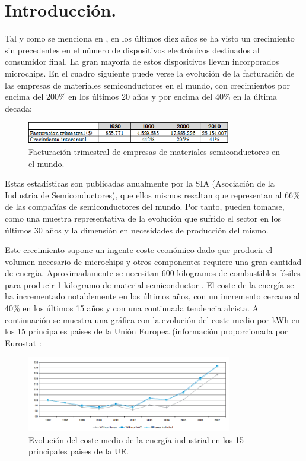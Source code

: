 \section{Introducción.}

Tal y como se menciona en \cite{reusing-silicon}, en los últimos diez años se ha visto un crecimiento sin 
precedentes en el número de dispositivos electrónicos destinados al consumidor final. La gran mayoría de estos dispositivos llevan incorporados microchips. En el cuadro siguiente puede verse la evolución de la facturación de las empresas de materiales semiconductores en el mundo, con crecimientos por encima del 200\% en los últimos 20 años y por encima del 40\% en la última decada:

\begin{figure}[H]
\begin{center}
\includegraphics[width=0.8\textwidth]{img/estadisticas_chips}
\caption{Facturación trimestral de empresas de materiales semiconductores en el mundo.}
\end{center}
\end{figure}

Estas estadísticas son publicadas anualmente por la SIA \cite{SIA} (Asociación de la Industria de Semiconductores), que ellos mismos resaltan que representan al 66\% de las compañías de semiconductores del mundo. Por tanto, pueden tomarse, como una muestra representativa de la evolución que sufrido el sector en los últimos 30 años y la dimensión en necesidades de producción del mismo.

Este crecimiento supone un ingente coste económico dado que producir el volumen necesario de microchips y otros componentes requiere una gran cantidad de energía. Aproximadamente se necesitan 600 kilogramos de combustibles fósiles para producir 1 kilogramo de material semiconductor \cite{reusing-silicon}. El coste de la energía se ha incrementado notablemente en los últimos años, con un incremento cercano al 40\% en los últimos 15 años y con una continuada tendencia alcista. A continuación se muestra una gráfica con la evolución del coste medio por kWh en los 15 principales paises de la Unión Europea (información proporcionada por Eurostat \cite{eurostat1}:

\begin{figure}[H]
\begin{center}
\includegraphics[width=0.8\textwidth]{img/precio_electricidad_industrial}
\caption{Evolución del coste medio de la energía industrial en los 15 principales paises de la UE.}
\end{center}
\end{figure}

